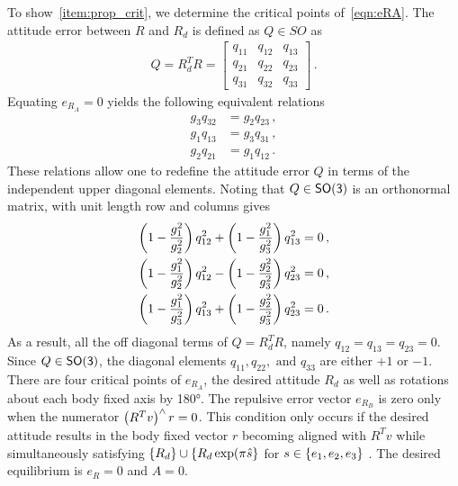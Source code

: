 \documentclass[letterpaper, 10 pt, conference]{ieeeconf}  %
\begin{document}
To show~\cref{item:prop_crit}, we determine the critical points of~\cref{eqn:eRA}.
The attitude error between \( R \) and \( R_d \) is defined as \( Q \in SO \) as
\begin{align*}
	Q = R_d^T R = 
	\begin{bmatrix}
		q_{11} & q_{12} & q_{13} \\
		q_{21} & q_{22} & q_{23} \\
		q_{31} & q_{32} & q_{33}
	\end{bmatrix} \, .
\end{align*}
Equating \( e_{R_{A}} = 0 \) yields the following equivalent relations
\begin{subequations}
\begin{align}
	g_3 q_{32} &= g_2 q_{23} \, , \\
	g_1 q_{13} &= g_3 q_{31} \, , \\
	g_2 q_{21} &= g_1 q_{12} \, .
\end{align}
\end{subequations}
These relations allow one to redefine the attitude error \( Q \) in terms of the independent upper diagonal elements.
Noting that \( Q \in \mathsf{SO(3)} \) is an orthonormal matrix, with unit length row and columns gives
\begin{subequations}
\begin{align}
	\left( 1 - \frac{g_1^2}{g_2^2} \right) q_{12}^2 + \left( 1 - \frac{g_1^2}{g_3^2} \right)q_{13}^2 &= 0 \, , \\
	\left( 1 - \frac{g_1^2}{g_2^2} \right) q_{12}^2 - \left( 1 - \frac{g_2^2}{g_3^2} \right) q_{23}^2 &= 0 \, , \\
	\left( 1-\frac{g_1^2}{g_3^2} \right) q_{13}^2 + \left( 1 - \frac{g_2^2}{g_3^2} \right) q_{23}^2 &= 0 \, .
\end{align}
\end{subequations}
As a result, all the off diagonal terms of \( Q = R_d^T R \), namely \( q_{12}= q_{13} = q_{23} = 0 \).
Since \( Q \in \mathsf{SO(3)} \), the diagonal elements \( q_{11}, q_{22}, \text{ and } q_{33} \) are either \( +1 \) or \(-1\).
There are four critical points of \( e_{R_A} \), the desired attitude \( R_d \) as well as rotations about each body fixed axis by \ang{180}.
The repulsive error vector \( e_{R_{B}} \) is zero only when the numerator \( \left( R^T v \right)^\wedge r = 0 \). 
This condition only occurs if the desired attitude results in the body fixed vector \( r \) becoming aligned with \(R^T v \) while simultaneously satisfying \(\left\{ R_d \right\} \cup \left\{ R_d \exp(\pi \hat{s} \right\} \) for \( s \in \left\{ e_1, e_2, e_3 \right\} \) .
The desired equilibrium is \( e_R = 0 \) and \( A = 0\).
\end{document}
